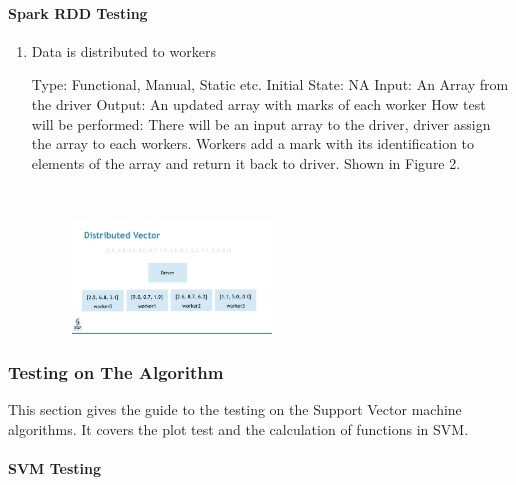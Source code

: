 \documentclass[12pt, titlepage]{article}
\begin{document}

\paragraph{ Spark RDD Testing}


\begin{enumerate}

\item{Data is distributed to workers\\}

Type: Functional, Manual, Static etc. 
Initial State: NA
Input: An Array from the driver
Output: An updated array with marks of each worker
How test will be performed: There will be an input array to the driver, driver assign the array to each workers. Workers add a mark with its identification to elements of the array and return it back to driver. Shown in Figure 2.

~\newline
\begin{figure}[h!]
\begin{center}
{
\includegraphics[width=0.5\textwidth]{sparkrdd.png}
}
\caption{\label{Input Data}}
\end{center}
\end{figure}

\end{enumerate}

\subsubsection{Testing on The Algorithm}
This section gives the guide to the testing on the Support Vector machine algorithms. It covers the plot test and the calculation of functions in SVM.
\paragraph{SVM Testing}
\end{document}

